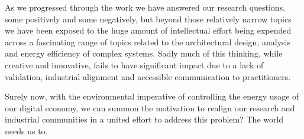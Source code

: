 As we progressed through the work we have answered our research questions, some positively and some negatively, but beyond those relatively narrow topics we have been exposed to the huge amount of intellectual effort being expended across a fascinating range of topics related to the architectural design, analysis and energy efficiency of complex systems.  Sadly much of this thinking, while creative and innovative, fails to have significant impact due to a lack of validation, industrial alignment and accessible communication to practitioners.

Surely now, with the environmental imperative of controlling the energy usage of our digital economy, we can summon the motivation to realign our research and industrial communities in a united effort to address this problem?  The world needs us to.


